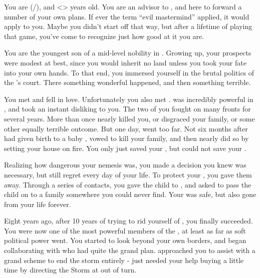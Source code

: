 \documentclass[char]{GL2020}
\begin{document}
\name{\cEvil{}}

You are \cEvil{} (\cEvil{\they}/\cEvil{\them}), and <> years old. You are an advisor to \cQueen{\full}, and here to forward a number of your own plans. If ever the term “evil mastermind” applied, it would apply to you. Maybe you didn’t start off that way, but after a lifetime of playing that game, you’ve come to recognize just how good at it you are.

You are the youngest son of a mid-level nobility in \pFarm{}. Growing up, your prospects were modest at best, since you would inherit no land unless you took your fate into your own hands. To that end, you immersed yourself in the brutal politics of the \cQueen{\Majesty}’s court. There something wonderful happened, and then something terrible.

You met \cPirateChildParent{} and fell in love. Unfortunately you also met \cEvilNemesis{}. \cEvilNemesis{} was incredibly powerful in \pFarm{}, and took an instant disliking to you. The two of you fought on many fronts for several years. More than once \cEvilNemesis{\they} nearly killed you, or disgraced your family, or some other equally terrible outcome. But one day, \cEvilNemesis{\they} went too far. Not six months after \cPirateChildParent{} had given birth to a baby \cPirateChild{\kid}, \cEvilNemesis{} vowed to kill your family, and then nearly did so by setting your house on fire. You only just saved your \cPirateChild{\child}, but could not save your \cPirateChildParent{\spouse}.

Realizing how dangerous your nemesis was, you made a decision you knew was necessary, but still regret every day of your life. To protect your \cPirateChild{\child}, you gave them away. Through a series of contacts, you gave the child to \cEthics{}, and asked \cEthics{\them} to pass the child on to a family somewhere you could never find. Your \cPirateChild{\child} was safe, but \cPirateChild{\they} \cPirateChild{\were} also gone from your life forever.

Eight years ago, after 10 years of trying to rid yourself of \cEvilNemesis{}, you finally succeeded. You were now one of the most powerful members of the \pFarm{}, at least as far as soft political power went. You started to look beyond your own borders, and began collaborating with \cDiplomat{} who had quite the grand plan. \cDiplomat{\They} approached you to assist with a grand scheme to end the storm entirely - \cDiplomat{\they} just needed your help buying a little time by directing the Storm at \pShip{} out of turn.
\end{document}
